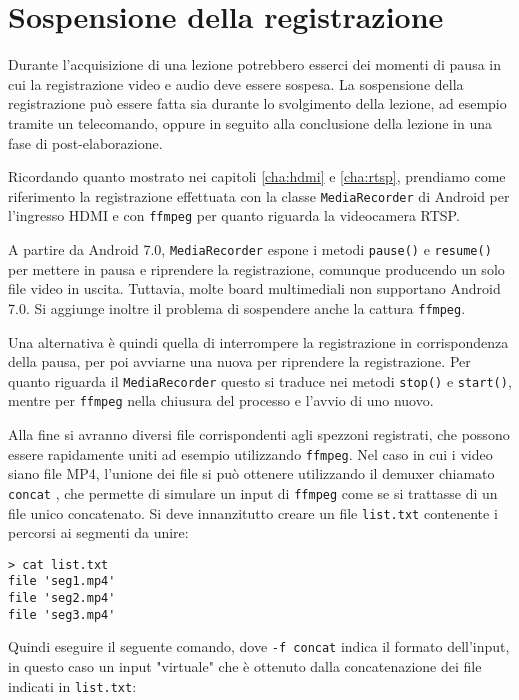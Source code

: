 \chapter{Sospensione della registrazione}
\label{cha:pausa}

Durante l'acquisizione di una lezione potrebbero esserci dei momenti di pausa in cui la registrazione video e audio deve essere sospesa. La sospensione della registrazione può essere fatta sia durante lo svolgimento della lezione, ad esempio tramite un telecomando, oppure in seguito alla conclusione della lezione in una fase di post-elaborazione.

Ricordando quanto mostrato nei capitoli \ref{cha:hdmi} e \ref{cha:rtsp}, prendiamo come riferimento la registrazione effettuata con la classe \texttt{MediaRecorder} di Android per l'ingresso HDMI e con \texttt{ffmpeg} per quanto riguarda la videocamera RTSP.

A partire da Android 7.0, \texttt{MediaRecorder} espone i metodi \texttt{pause()} e \texttt{resume()} per mettere in pausa e riprendere la registrazione, comunque producendo un solo file video in uscita. Tuttavia, molte board multimediali non supportano Android 7.0. Si aggiunge inoltre il problema di sospendere anche la cattura \texttt{ffmpeg}.

Una alternativa è quindi quella di interrompere la registrazione in corrispondenza della pausa, per poi avviarne una nuova per riprendere la registrazione. Per quanto riguarda il \texttt{MediaRecorder} questo si traduce nei metodi \texttt{stop()} e \texttt{start()}, mentre per \texttt{ffmpeg} nella chiusura del processo e l'avvio di uno nuovo.

Alla fine si avranno diversi file corrispondenti agli spezzoni registrati, che possono essere rapidamente uniti ad esempio utilizzando \texttt{ffmpeg}. Nel caso in cui i video siano file MP4, l'unione dei file si può ottenere utilizzando il demuxer chiamato \texttt{concat} \cite{ffmpeg}, che permette di simulare un input di \texttt{ffmpeg} come se si trattasse di un file unico concatenato. Si deve innanzitutto creare un file \texttt{list.txt} contenente i percorsi ai segmenti da unire:

\begin{verbatim}
> cat list.txt
file 'seg1.mp4'
file 'seg2.mp4'
file 'seg3.mp4'
\end{verbatim}

Quindi eseguire il seguente comando, dove \texttt{-f concat} indica il formato dell'input, in questo caso un input "virtuale" che è ottenuto dalla concatenazione dei file indicati in \texttt{list.txt}:

